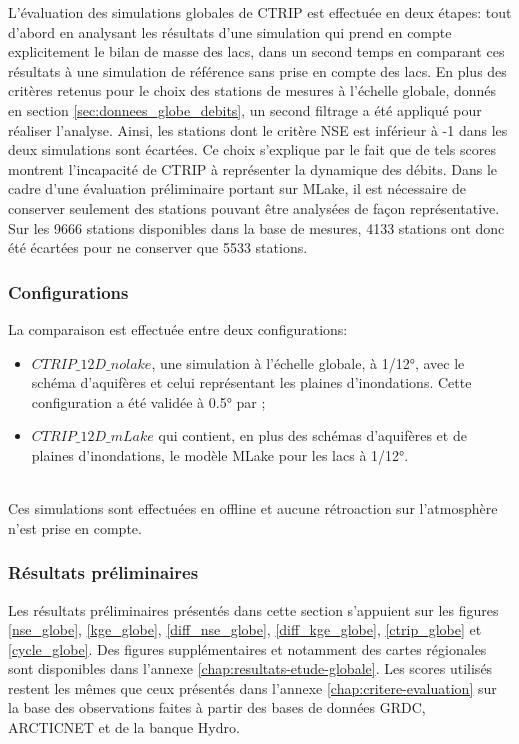 L'évaluation des simulations globales de CTRIP est effectuée en deux étapes: tout d'abord en analysant les résultats d'une simulation qui prend en compte explicitement le bilan de masse des lacs,  dans un second temps en comparant ces résultats à une simulation de référence sans prise en compte des lacs. En plus des critères retenus pour le choix des stations de mesures à l'échelle globale, donnés en section \ref{sec:donnees_globe_debits}, un second filtrage a été appliqué pour réaliser l'analyse. Ainsi, les stations dont le critère NSE est inférieur à -1 dans les deux simulations sont écartées. Ce choix s'explique par le fait que de tels scores montrent l'incapacité de CTRIP à représenter la dynamique des débits. Dans le cadre d'une évaluation préliminaire portant sur MLake, il est nécessaire de conserver seulement des stations pouvant être analysées de façon représentative. Sur les 9666 stations disponibles dans la base de mesures, 4133 stations ont  donc été écartées pour ne conserver que 5533 stations. \\

\subsubsection*{Configurations}

La comparaison est effectuée entre deux configurations:\\

\begin{itemize}
\item $CTRIP\_12D\_nolake$, une simulation à l'échelle globale, à 1/12°, avec le schéma d'aquifères et celui représentant les plaines d'inondations. Cette configuration a été validée à 0.5° par \citet{decharme2019};\\

\item $CTRIP\_12D\_mLake$ qui contient, en plus des schémas d'aquifères et de plaines d'inondations, le modèle MLake pour les lacs à 1/12°.
\end{itemize}
~\\
Ces simulations sont effectuées en offline et aucune rétroaction sur l'atmosphère n'est prise en compte.

\subsubsection*{Résultats préliminaires}

Les résultats préliminaires présentés dans cette section s'appuient sur les figures \ref{nse_globe}, \ref{kge_globe}, \ref{diff_nse_globe}, \ref{diff_kge_globe}, \ref{ctrip_globe} et \ref{cycle_globe}. Des figures supplémentaires et notamment des cartes régionales sont disponibles dans l'annexe \ref{chap:resultats-etude-globale}. Les scores utilisés restent les mêmes que ceux présentés dans l'annexe \ref{chap:critere-evaluation} sur la base des observations faites à partir des bases de données GRDC, ARCTICNET et de la banque Hydro. \\

